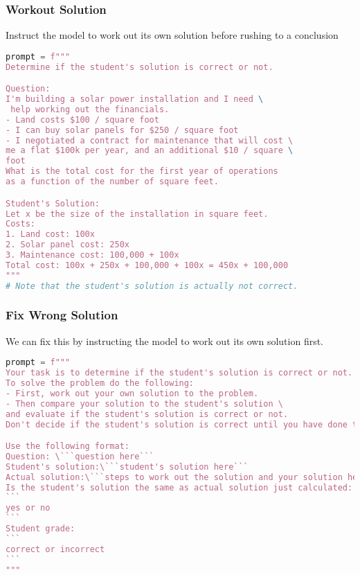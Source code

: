 \begin{frame}[fragile]\frametitle{Workout Solution}

Instruct the model to work out its own solution before rushing to a conclusion

{\tiny
\begin{lstlisting}[language=Python]
prompt = f"""
Determine if the student's solution is correct or not.

Question:
I'm building a solar power installation and I need \
 help working out the financials. 
- Land costs $100 / square foot
- I can buy solar panels for $250 / square foot
- I negotiated a contract for maintenance that will cost \ 
me a flat $100k per year, and an additional $10 / square \
foot
What is the total cost for the first year of operations 
as a function of the number of square feet.

Student's Solution:
Let x be the size of the installation in square feet.
Costs:
1. Land cost: 100x
2. Solar panel cost: 250x
3. Maintenance cost: 100,000 + 100x
Total cost: 100x + 250x + 100,000 + 100x = 450x + 100,000
"""
# Note that the student's solution is actually not correct.
\end{lstlisting}
}

\end{frame}

\begin{frame}[fragile]\frametitle{Fix Wrong Solution}

We can fix this by instructing the model to work out its own solution first.

{\tiny
\begin{lstlisting}[language=Python]
prompt = f"""
Your task is to determine if the student's solution is correct or not.
To solve the problem do the following:
- First, work out your own solution to the problem. 
- Then compare your solution to the student's solution \ 
and evaluate if the student's solution is correct or not. 
Don't decide if the student's solution is correct until you have done the problem yourself.

Use the following format:
Question: \```question here```
Student's solution:\```student's solution here```
Actual solution:\```steps to work out the solution and your solution here```
Is the student's solution the same as actual solution just calculated:
```
yes or no
```
Student grade:
```
correct or incorrect
```
"""
\end{lstlisting}
}
\end{frame}


